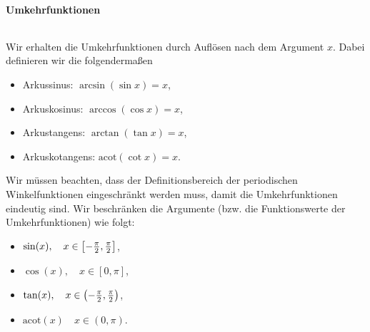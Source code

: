 \paragraph{Umkehrfunktionen}$~$

Wir erhalten die Umkehrfunktionen durch Auflösen nach dem Argument $x$. Dabei definieren wir die folgendermaßen
\begin{itemize}
    \item Arkussinus: \hphantom{ko}\;\qquad$\arcsin(\sin x) = x$,
    \item Arkuskosinus: \qquad\;$\arccos(\cos x) = x$,
    \item Arkustangens: \quad\hphantom{ko}$\arctan(\tan x) = x$,
    \item Arkuskotangens: \quad$\text{acot}(\cot x) = x.$
\end{itemize}

Wir müssen beachten, dass der Definitionsbereich der periodischen Winkelfunktionen eingeschränkt werden muss, damit die Umkehrfunktionen eindeutig sind. Wir beschränken die Argumente (bzw. die Funktionswerte der Umkehrfunktionen) wie folgt: 
\begin{itemize}
    \item $\sin(x), \quad x\in\qty[-\frac{\pi}{2},\frac{\pi}{2}]$,
    \item $\cos(x), \quad x\in[0,\pi]$,
    \item $\tan(x), \quad x \in \qty(-\frac{\pi}{2},\frac{\pi}{2})$,
    \item $\text{acot}(x) \quad x \in (0,\pi).$
\end{itemize}

